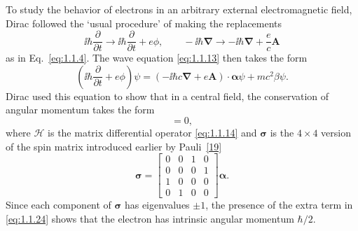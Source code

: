 To study the behavior of electrons in an arbitrary external electromagnetic
field, Dirac followed the `usual procedure' of making the replacements
\begin{equation}
  \ii\hbar\frac{\partial}{\partial t}
  \longrightarrow \ii\hbar\frac{\partial}{\partial t}+e\phi,
  \qquad
  -\ii\hbar\boldsymbol{\nabla}\longrightarrow-\ii\hbar\boldsymbol{\nabla}+\frac{e}{c}\mathbf{A}
  \tag{1.1.22}\label{eq:1.1.22}
\end{equation}
as in Eq.~\eqref{eq:1.1.4}. The wave equation \eqref{eq:1.1.13} then takes the form
\begin{equation}
  \left(\ii\hbar\frac{\partial}{\partial t}+e\phi\right)\psi
  =(-\ii\hbar c\boldsymbol{\nabla}+e\mathbf{A})\cdot\boldsymbol{\alpha}\psi+mc^2\beta\psi.
  \tag{1.1.23}\label{eq:1.1.23}
\end{equation}
Dirac used this equation to show that in a central field, the conservation
of angular momentum takes the form
\begin{equation}
  [\mathcal{H},-\ii\hbar\mathbf{r}\cdot\boldsymbol{\nabla}+\hbar\boldsymbol{\sigma}/2]=0,
  \tag{1.1.24}\label{eq:1.1.24}
\end{equation}
where $\mathcal{H}$ is the matrix differential operator \eqref{eq:1.1.14} and $\boldsymbol{\sigma}$ is the $4\times4$
version of the spin matrix introduced earlier by Pauli~\hyperref[ref:1.19]{[19]}
\begin{equation}
  \boldsymbol{\sigma}=
  \begin{bmatrix}
    0&0&1&0\\
    0&0&0&1\\
    1&0&0&0\\
    0&1&0&0
  \end{bmatrix}\boldsymbol{\alpha}.
  \tag{1.1.25}\label{eq:1.1.25}
\end{equation}
Since each component of $\boldsymbol{\sigma}$ has eigenvalues $\pm1$, the presence of the extra
term in \eqref{eq:1.1.24} shows that the electron has intrinsic angular momentum
$\hbar/2$.

